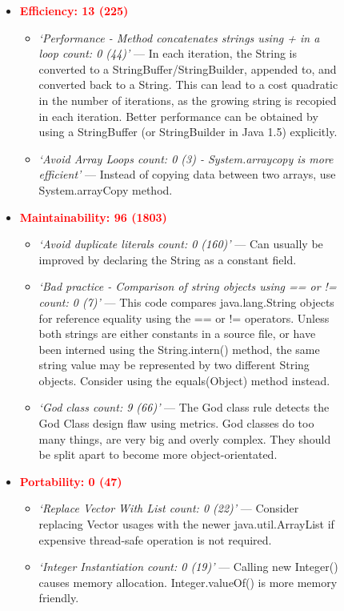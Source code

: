 \begin{figure}[ptb]
\begin{framed}
\begin{itemize}
    \item \textcolor{red}{\textbf{Efficiency: 13 (225)}}
    \begin{itemize}
        \item \textit{`Performance -  Method concatenates strings using + in a loop count: 0 (44)'} --- In each iteration, the String is converted to a StringBuffer/StringBuilder, appended to, and converted back to a String. This can lead to a cost quadratic in the number of iterations, as the growing string is recopied in each iteration. Better performance can be obtained by using a StringBuffer (or StringBuilder in Java 1.5) explicitly.
        \item \textit{`Avoid Array Loops count: 0 (3) - System.arraycopy is more efficient'} --- Instead of copying data between two arrays, use System.arrayCopy method.
    \end{itemize}

    \item \textcolor{red}{\textbf{Maintainability: 96 (1803)}}
    \begin{itemize}
        \item \textit{`Avoid duplicate literals count: 0 (160)'} --- Can usually be improved by declaring the String as a constant field.
        \item \textit{`Bad practice - Comparison of string objects using == or != count: 0 (7)'} --- This code compares java.lang.String objects for reference equality using the == or != operators. Unless both strings are either constants in a source file, or have been interned using the String.intern() method, the same string value may be represented by two different String objects. Consider using the equals(Object) method instead.
        \item \textit{`God class count: 9 (66)'} --- The God class rule detects the God Class design flaw using metrics. God classes do too many things, are very big and overly complex. They should be split apart to become more object-orientated. 
    \end{itemize}
      
     \item \textcolor{red}{\textbf{Portability: 0 (47)}} 
    \begin{itemize}
        \item \textit{`Replace Vector With List count: 0 (22)'} ---
            Consider replacing Vector usages with the newer 
        java.util.ArrayList if expensive thread-safe operation is not required.
        \item \textit{`Integer Instantiation count: 0 (19)'} --- Calling new Integer() causes memory allocation. Integer.valueOf() is more memory friendly.
    \end{itemize}
    

\end{itemize}
\end{framed}
\end{figure}
